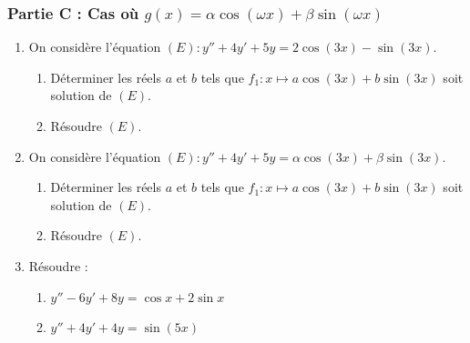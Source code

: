 \documentclass[12pt,a4paper]{article}
\begin{document}
\subsubsection*{Partie C : Cas où $g(x) = \alpha\cos(\omega x) + \beta\sin(\omega x)$}
\begin{enumerate}
    \item On considère l'équation $(E) : y'' + 4y' + 5y = 2\cos(3x) - \sin(3x).$
    \begin{enumerate}[label=\alph*)]
        \item Déterminer les réels $a$ et $b$ tels que $f_{1} : x \mapsto a\cos(3x) + b\sin(3x)$ soit solution de $(E)$.
        \item Résoudre $(E)$.
    \end{enumerate}
    \item On considère l'équation $(E) : y'' + 4y' + 5y = \alpha\cos(3x) + \beta\sin(3x).$
    \begin{enumerate}[label=\alph*)]
        \item Déterminer les réels $a$ et $b$ tels que $f_{1} : x \mapsto a\cos(3x) + b\sin(3x)$ soit solution de $(E)$.
        \item Résoudre $(E)$.
    \end{enumerate}
    \item Résoudre :
    \begin{enumerate}[label=\alph*)]
        \item $y'' - 6y' + 8y = \cos x + 2\sin x$
        \item $y'' + 4y' + 4y = \sin(5x)$
    \end{enumerate}
\end{enumerate}
\end{document}
